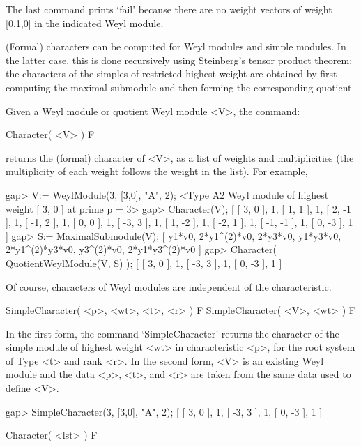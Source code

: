 The last command prints `fail' because there are no weight vectors of
weight [0,1,0] in the indicated Weyl module.



(Formal) characters can be computed for Weyl modules and simple
modules. In the latter case, this is done recursively using
Steinberg's tensor product theorem; the characters of the simples
of restricted highest weight are obtained by first computing the
maximal submodule and then forming the corresponding quotient.



Given a Weyl module or quotient Weyl module <V>, the command:

\>Character( <V> ) F

returns the (formal) character of <V>, as a list of weights and
multiplicities (the multiplicity of each weight follows the weight in
the list). For example,

\beginexample
gap> V:= WeylModule(3, [3,0], "A", 2);
<Type A2 Weyl module of highest weight [ 3, 0 ] at prime p = 3>
gap> Character(V);
[ [ 3, 0 ], 1, [ 1, 1 ], 1, [ 2, -1 ], 1, [ -1, 2 ], 1, [ 0, 0 ], 1, 
  [ -3, 3 ], 1, [ 1, -2 ], 1, [ -2, 1 ], 1, [ -1, -1 ], 1, [ 0, -3 ], 1 ]
gap> S:= MaximalSubmodule(V);
[ y1*v0, 2*y1^(2)*v0, 2*y3*v0, y1*y3*v0, 2*y1^(2)*y3*v0, y3^(2)*v0, 
  2*y1*y3^(2)*v0 ]
gap> Character( QuotientWeylModule(V, S) );
[ [ 3, 0 ], 1, [ -3, 3 ], 1, [ 0, -3 ], 1 ]
\endexample

Of course, characters of Weyl modules are independent of the
characteristic.

\>SimpleCharacter( <p>, <wt>, <t>, <r> ) F
\>SimpleCharacter( <V>, <wt> ) F

In the first form, the command `SimpleCharacter' returns the character
of the simple module of highest weight <wt> in characteristic <p>, for
the root system of Type <t> and rank <r>. In the second form, <V> is
an existing Weyl module and the data <p>, <t>, and <r> are taken from
the same data used to define <V>.

\beginexample
gap> SimpleCharacter(3, [3,0], "A", 2);    
[ [ 3, 0 ], 1, [ -3, 3 ], 1, [ 0, -3 ], 1 ]
\endexample


\>Character( <lst> ) F

